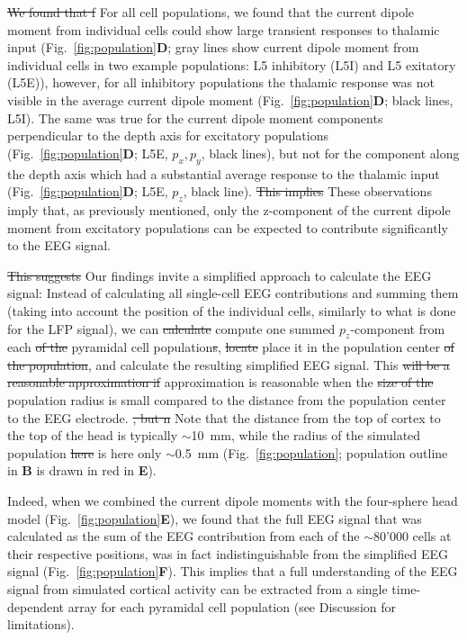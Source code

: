 \documentclass[preprint,10pt,authoryear]{elsarticle}
\newcommand{\hlb}[2][NavyBlue]{ {\sethlcolor{#1} \hl{#2}} }
\newcommand{\snnote}[1]{\color{white}{\hlb{SN: #1 }}\color{black}}
\newcommand{\sntxt}[1]{{\color{NavyBlue}#1}}
\begin{document}
\sntxt{\sout{We found that f} F}or all cell populations\sntxt{, we found that} the current dipole moment\snnote{plural or not??} from individual cells could show large transient responses to thalamic input (Fig.~\ref{fig:population}\textbf{D}; gray lines show current dipole moment from individual cells in two example populations: L5 inhibitory (L5I) and L5 exitatory (L5E)), however, for all inhibitory populations the thalamic response was not visible in the average current dipole moment (Fig.~\ref{fig:population}\textbf{D}; black lines, L5I). The same was true for the current dipole moment components perpendicular to the depth axis for excitatory populations (Fig.~\ref{fig:population}\textbf{D}; L5E, $p_x, p_y$, black lines), but not for the component along the depth axis which had a substantial average response to the thalamic input (Fig.~\ref{fig:population}\textbf{D}; L5E, $p_z$, black line). 
\sntxt{\sout{This implies} These observations imply} that, as previously mentioned, only the z-component of the current dipole moment from excitatory populations can be expected to contribute significantly to the EEG signal.

\sntxt{\sout{This suggests} Our findings invite} a simplified approach to calculate the EEG signal: Instead of calculating all single-cell EEG contributions and summing them (taking into account the position of the individual cells, similarly to what is done for the LFP signal), we can \sntxt{\sout{calculate} compute} one summed $p_z$-component from each \sntxt{\sout{of the}} pyramidal cell population\sntxt{\sout{s}}, \sntxt{\sout{locate} place} it in the \sntxt{population} center \sntxt{\sout{of the population}}, and calculate the resulting simplified EEG signal. This \sntxt{\sout{will be a reasonable approximation if} approximation is reasonable when} the \sntxt{\sout{size of the}} population \sntxt{radius} is small compared to the distance \sntxt{from the population center }to the EEG electrode\sntxt{. \sout{, but  n} N}ote that the distance from the top of cortex to the top of the head is typically $\sim$10~mm, while the radius of the simulated population \sntxt{\sout{here}} is \sntxt{here} only $\sim$0.5~mm (Fig.~\ref{fig:population}; population outline in \textbf{B} is drawn in red in \textbf{E}).

Indeed, when we combined the current dipole moments with the four-sphere head model (Fig.~\ref{fig:population}\textbf{E}), we found that the full EEG signal that was calculated as the sum of the EEG contribution from each of the $\sim$80'000 cells at their respective positions, was in fact indistinguishable from the simplified EEG signal (Fig.~\ref{fig:population}\textbf{F}). This implies that a full understanding of the EEG signal from simulated cortical activity can be extracted from a single time-dependent array for each pyramidal cell population (see Discussion for limitations).
\end{document}
